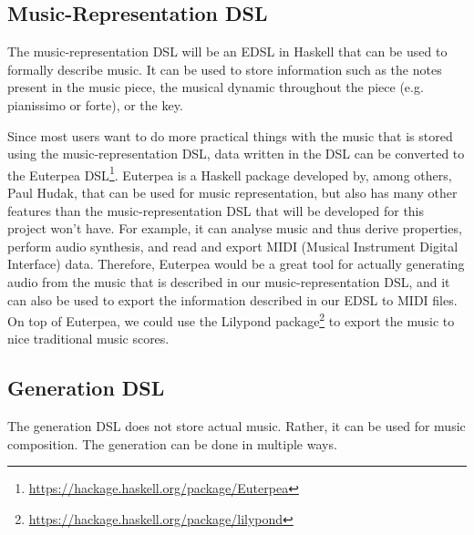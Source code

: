 \documentclass[12pt,a4paper]{article}
\newcommand{\site}[1]{\footnote{\url{#1}}}
\begin{document}
\subsection{Music-Representation DSL}
The music-representation DSL will be an EDSL in Haskell that can be used to formally describe music. It can be used to store information such as the notes present in the music piece, the musical dynamic throughout the piece (e.g. pianissimo or forte), or the key.

Since most users want to do more practical things with the music that is stored using the music-representation DSL, data written in the DSL can be converted to the Euterpea DSL\site{https://hackage.haskell.org/package/Euterpea}. Euterpea is a Haskell package developed by, among others, Paul Hudak, that can be used for music representation, but also has many other features than the music-representation DSL that will be developed for this project won't have. For example, it can analyse music and thus derive properties, perform audio synthesis, and read and export MIDI (Musical Instrument Digital Interface) data. Therefore, Euterpea would be a great tool for actually generating audio from the music that is described in our music-representation DSL, and it can also be used to export the information described in our EDSL to MIDI files. On top of Euterpea, we could use the Lilypond package\site{https://hackage.haskell.org/package/lilypond} to export the music to nice traditional music scores.


\subsection{Generation DSL}
The generation DSL does not store actual music. Rather, it can be used for music composition. The generation can be done in multiple ways.
\end{document}
